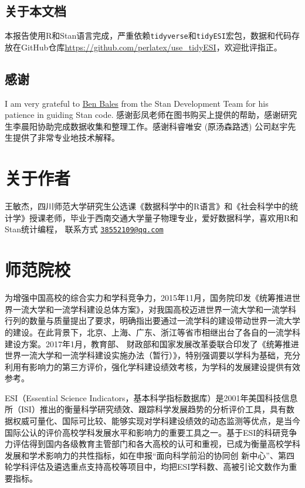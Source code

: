 \documentclass[cn, 11pt, fancy, hide]{elegantbook}
\begin{document}
\hypertarget{ux5173ux4e8eux672cux6587ux6863}{%
\section*{关于本文档}\label{ux5173ux4e8eux672cux6587ux6863}}

本报告使用R和Stan语言完成，严重依赖\texttt{tidyverse}和\texttt{tidyESI}宏包，数据和代码存放在GitHub仓库\url{https://github.com/perlatex/use_tidyESI}，欢迎批评指正。

\hypertarget{ux611fux8c22}{%
\section*{感谢}\label{ux611fux8c22}}

I am very grateful to \href{https://github.com/bbbales2}{Ben Bales} from the Stan Development Team for his patience in guiding Stan code.
感谢彭凤老师在图书购买上提供的帮助，感谢研究生李晨阳协助完成数据收集和整理工作。感谢科睿唯安 (原汤森路透) 公司赵宇先生提供了非常专业地技术解释。

\hypertarget{author}{%
\chapter*{关于作者}\label{author}}

王敏杰，四川师范大学研究生公选课《数据科学中的R语言》和《社会科学中的统计学》授课老师，毕业于西南交通大学量子物理专业，爱好数据科学，喜欢用R和Stan统计编程，
联系方式 \href{mailto:38552109@qq.com}{\nolinkurl{38552109@qq.com}}

\hypertarget{bigdata}{%
\chapter{师范院校}\label{bigdata}}

为增强中国高校的综合实力和学科竞争力，2015年11月，国务院印发《统筹推进世界一流大学和一流学科建设总体方案》，对我国高校迈进世界一流大学和一流学科行列的数量与质量提出了要求，明确指出要通过一流学科的建设带动世界一流大学的建设。在此背景下，北京、上海、广东、浙江等省市相继出台了各自的一流学科建设方案。2017年1月，教育部、
财政部和国家发展改革委联合印发了《统筹推进世界一流大学和一流学科建设实施办法（暂行）》，特别强调要以学科为基础，充分利用有影响力的第三方评价，强化学科建设绩效考核，为学科的发展建设提供有效参考。

ESI（Essential Science Indicators，基本科学指标数据库）是2001年美国科技信息所（ISI）推出的衡量科学研究绩效、跟踪科学发展趋势的分析评价工具，具有数据权威可量化、国际可比较、能够实现对学科建设绩效的动态监测等优点，是当今国际公认的评价高校学科发展水平和影响力的重要工具之一。基于ESI的科研竞争力评估得到国内各级教育主管部门和各大高校的认可和重视，已成为衡量高校学科发展和学术影响力的共性指标，如在申报``面向科学前沿的协同创
新中心''、第四轮学科评估及遴选重点支持高校等项目中，均把ESI学科数、高被引论文数作为重要指标。
\end{document}
